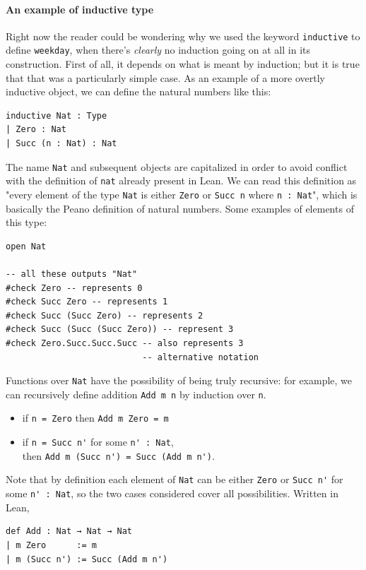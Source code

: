 \documentclass[oneside]{book}
\theoremstyle{definition}
\theoremstyle{remark}
\theoremstyle{plain}
\begin{document}
\paragraph{An example of inductive type}
Right now the reader could be wondering why we used the keyword \lstinline{inductive} to define \lstinline{weekday},
when there's \textit{clearly} no induction going on at all in its construction.
First of all, it depends on what is meant by induction; but it is true that that was a particularly simple case.
As an example of a more overtly inductive object, we can define the natural numbers like this:
\begin{lstlisting}
inductive Nat : Type
| Zero : Nat
| Succ (n : Nat) : Nat
\end{lstlisting}
The name \lstinline{Nat} and subsequent objects are capitalized in order to avoid conflict with the definition of \lstinline{nat} already present in Lean.
We can read this definition as "every element of the type \lstinline{Nat} is either \lstinline{Zero}
or \lstinline{Succ n} where \lstinline{n : Nat}",
which is basically the Peano definition of natural numbers.
Some examples of elements of this type:
\begin{lstlisting}
open Nat

-- all these outputs "Nat"
#check Zero -- represents 0
#check Succ Zero -- represents 1
#check Succ (Succ Zero) -- represents 2
#check Succ (Succ (Succ Zero)) -- represent 3
#check Zero.Succ.Succ.Succ -- also represents 3
                           -- alternative notation
\end{lstlisting}
Functions over \lstinline{Nat} have the possibility of being truly recursive:
for example, we can recursively define addition \lstinline{Add m n} by induction over \lstinline{n}.
\begin{itemize}
\item if \lstinline{n = Zero} then \lstinline{Add m Zero = m}
\item if \lstinline{n = Succ n'} for some \lstinline{n' : Nat}, \\
      then \lstinline{Add m (Succ n') = Succ (Add m n')}.
\end{itemize}
Note that by definition each element of \lstinline{Nat} can be either \lstinline{Zero} or \lstinline{Succ n'} for some \lstinline{n' : Nat},
so the two cases considered cover all possibilities.
Written in Lean,
\begin{lstlisting}
def Add : Nat → Nat → Nat
| m Zero      := m
| m (Succ n') := Succ (Add m n')
\end{lstlisting}
\end{document}
